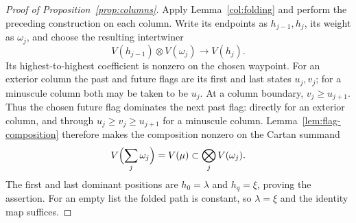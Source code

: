 \begin{proof}[Proof of Proposition~\ref{prop:columns}]
Apply Lemma~\ref{col:folding} and perform the preceding construction
on each column.  Write its endpoints as $h_{j-1},h_j$, its weight
as $\omega_j$, and choose the resulting intertwiner
\[
 V(h_{j-1})\otimes V(\omega_j)\longrightarrow V(h_j).
\]
Its highest-to-highest coefficient is nonzero on the chosen waypoint.
For an exterior column the past and future flags are its first and
last states $u_j,v_j$; for a minuscule column both may be taken to
be $u_j$.  At a column boundary, $v_j\ge u_{j+1}$.
Thus the chosen future flag dominates the next past flag: directly
for an exterior column, and through
$u_j\ge v_j\ge u_{j+1}$ for a minuscule column.
Lemma~\ref{lem:flag-composition} therefore makes
the composition nonzero on the Cartan summand
\[
 V\Bigl(\sum_j\omega_j\Bigr)=V(\mu)
 \subset\bigotimes_jV(\omega_j).
\]
The first and last dominant positions are $h_0=\lambda$ and
$h_q=\xi$, proving the assertion.  For an empty list the folded
path is constant, so $\lambda=\xi$ and the identity map suffices.
\end{proof}
